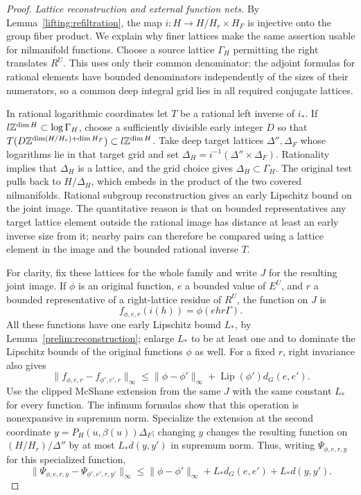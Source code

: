 \begin{proof}
\emph{Lattice reconstruction and external function nets.}
By Lemma~\ref{lifting:refiltration}, the map
$i:H\to H/H_r\times H_F$ is injective onto the group fiber product.
We explain why finer lattices make the same assertion usable for
nilmanifold functions.  Choose a source lattice $\Gamma_H$ permitting
the right translates $R^U$.  This uses only their common denominator:
the adjoint formulas for rational elements have bounded denominators
independently of the sizes of their numerators, so a common deep
integral grid lies in all required conjugate lattices.

In rational logarithmic coordinates let $T$ be a rational left
inverse of $i_*$.  If $l\mathbb Z^{\dim H}\subset\log\Gamma_H$, choose
a sufficiently divisible early integer $D$ so that
$T(D\mathbb Z^{\dim(H/H_r)+\dim H_F})\subset l\mathbb Z^{\dim H}$.
Take deep target lattices $\Delta'',\Delta_F$ whose logarithms lie
in that target grid and set
$\Delta_H=i^{-1}(\Delta''\times\Delta_F)$.
Rationality implies that $\Delta_H$ is a lattice, and the grid
choice gives $\Delta_H\subset\Gamma_H$.  The original test pulls
back to $H/\Delta_H$, which embeds in the product of the two covered
nilmanifolds.  Rational subgroup reconstruction gives an early
Lipschitz bound on the joint image.  The quantitative reason is that
on bounded representatives any target lattice element outside the
rational image has distance at least an early inverse size from it;
nearby pairs can therefore be compared using a lattice element in
the image and the bounded rational inverse $T$.

For clarity, fix these lattices for the whole family and write $J$
for the resulting joint image.  If $\phi$ is an original function,
$e$ a bounded value of $E^U$, and $r$ a bounded representative of a
right-lattice residue of $R^U$, the function on $J$ is
\[
 f_{\phi,e,r}(i(h))=\phi(ehr\Gamma).
\]
All these functions have one early Lipschitz bound $L_*$, by
Lemma~\ref{prelim:reconstruction}; enlarge $L_*$ to be at least one
and to dominate the Lipschitz bounds of the original functions
$\phi$ as well.  For a fixed $r$, right invariance
also gives
\[
 \|f_{\phi,e,r}-f_{\phi',e',r}\|_\infty
 \le \|\phi-\phi'\|_\infty+
       \operatorname{Lip}(\phi')d_G(e,e').
\]
Use the clipped McShane extension from the same $J$ with the same
constant $L_*$ for every function.  The infimum formulas show that
this operation is nonexpansive in supremum norm.  Specialize the
extension at the second coordinate $y=P_H(u,\beta(u))\Delta_F$;
changing $y$ changes the resulting function on $(H/H_r)/\Delta''$
by at most $L_*d(y,y')$ in supremum norm.
Thus, writing $\Psi_{\phi,e,r,y}$ for this specialized function,
\[
 \|\Psi_{\phi,e,r,y}-\Psi_{\phi',e',r,y'}\|_\infty
 \le \|\phi-\phi'\|_\infty
       +L_*d_G(e,e')+L_*d(y,y').
\]


\end{proof}

